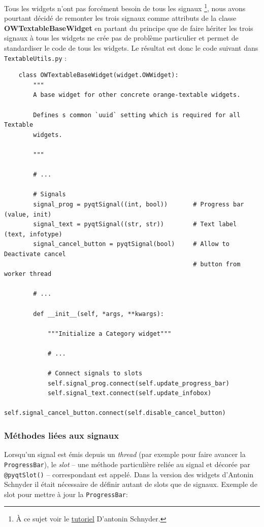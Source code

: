 \documentclass{article}
\begin{document}
Tous les widgets n'ont pas forcément besoin de tous les signaux \footnote{À ce sujet voir le \href{https://docs.google.com/document/d/1QtXm2aYMZXAyM7mfBTqxt_XrTNFqC7e3aqy7OC1A_18/edit}{tutoriel} D'antonin Schnyder.}, nous avons pourtant décidé de remonter les trois signaux comme attributs de la classe \textbf{OWTextableBaseWidget} en partant du principe que de faire hériter les trois signaux à tous les widgets ne crée pas de problème particulier et permet de standardiser le code de tous les widgets. 
\newline
Le résultat est donc le code suivant dans \texttt{TextableUtils.py} : 

\begin{verbatim}
    class OWTextableBaseWidget(widget.OWWidget):
        """
        A base widget for other concrete orange-textable widgets.
    
        Defines s common `uuid` setting which is required for all Textable
        widgets.
    
        """

        # ...

        # Signals
        signal_prog = pyqtSignal((int, bool))       # Progress bar (value, init)
        signal_text = pyqtSignal((str, str))        # Text label (text, infotype)
        signal_cancel_button = pyqtSignal(bool)     # Allow to Deactivate cancel
                                                    # button from worker thread

        # ...
        
        def __init__(self, *args, **kwargs):

            """Initialize a Category widget"""

            # ...

            # Connect signals to slots
            self.signal_prog.connect(self.update_progress_bar) 
            self.signal_text.connect(self.update_infobox)
            self.signal_cancel_button.connect(self.disable_cancel_button)
\end{verbatim}

\subsubsection{Méthodes liées aux signaux}

Lorsqu'un signal est émis depuis un \textit{thread} (par exemple pour faire avancer la \texttt{ProgressBar}),  le \textit{slot} – une méthode particulière reliée au signal et décorée par \texttt{@pyqtSlot()} – correspondant est appelé. Dans la version des widgets d'Antonin Schnyder il était nécessaire de définir autant de slots que de signaux.
\newline
Exemple de slot pour mettre à jour la \texttt{ProgressBar}:
\end{document}
